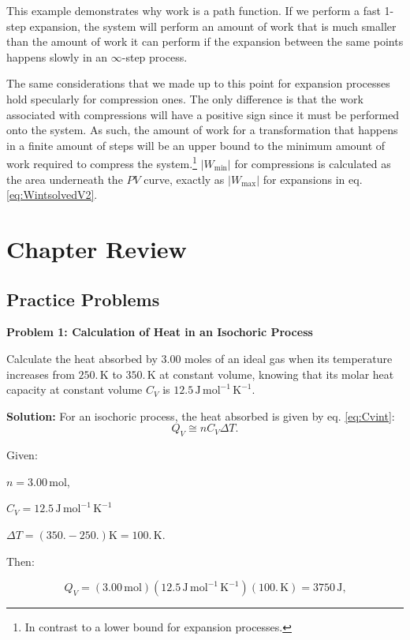 \documentclass[
  9pt,
]{extbook}
\theoremstyle{definition}
\theoremstyle{definition}
\theoremstyle{definition}
\theoremstyle{remark}
\begin{document}
This example demonstrates why work is a path function. If we perform a fast 1-step expansion, the system will perform an amount of work that is much smaller than the amount of work it can perform if the expansion between the same points happens slowly in an \(\infty\)-step process.

The same considerations that we made up to this point for expansion processes hold specularly for compression ones. The only difference is that the work associated with compressions will have a positive sign since it must be performed onto the system. As such, the amount of work for a transformation that happens in a finite amount of steps will be an upper bound to the minimum amount of work required to compress the system.\footnote{In contrast to a lower bound for expansion processes.} \(\left| W_{\text{min}} \right|\) for compressions is calculated as the area underneath the \(PV\) curve, exactly as \(\left| W_{\text{max}} \right|\) for expansions in eq. \eqref{eq:WintsolvedV2}.

\hypertarget{rev2}{%
\section{Chapter Review}\label{rev2}}

\hypertarget{exer2}{%
\subsection{Practice Problems}\label{exer2}}

\textbf{Problem 1: Calculation of Heat in an Isochoric Process}

Calculate the heat absorbed by 3.00 moles of an ideal gas when its temperature increases from \(250.\, \text{K}\) to \(350.\, \text{K}\) at constant volume, knowing that its molar heat capacity at constant volume \(C_V\) is \(12.5 \, \text{J} \, \text{mol}^{-1} \, \text{K}^{-1}\).

\textbf{Solution:} For an isochoric process, the heat absorbed is given by eq. \eqref{eq:Cvint}: \[  Q_V \cong n C_V \Delta T.\]

Given:

\(n=3.00 \, \text{mol}\),

\(C_V=12.5 \, \text{J} \, \text{mol}^{-1} \, \text{K}^{-1}\)

\(\Delta T = (350.-250.) \text{K}=100.\, \text{K}\).

Then:

\[Q_V=(3.00 \, \text{mol})(12.5\,\text{J} \, \text{mol}^{-1} \, \text{K}^{-1})(100.\,\text{K})=3750\,\text{J,}\]
\end{document}
